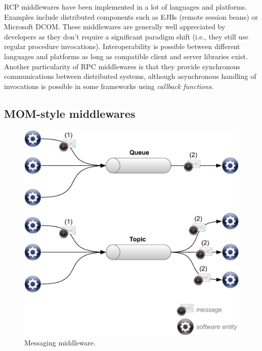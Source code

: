 RCP middlewares have been implemented in a lot of languages and platforms. Examples include distributed components such as EJBs (remote session beans) or Microsoft DCOM. These middlewares are generally well appreciated by developers as they don't require a significant paradigm shift (i.e., they still use regular procedure invocations). Interoperability is possible between different languages and platforms as long as compatible client and server libraries exist. Another particularity of RPC middlewares is that they provide synchronous communications between distributed systems, although asynchronous handling of invocations is possible in some frameworks using \emph{callback functions}.\\


\subsection{MOM-style middlewares}


\begin{figure}[htbp]
    \centering
    \includegraphics[width=\textwidth]{content/web-services/messaging-middleware}
    \caption{Messaging middleware.}
    \label{fig:messaging-middleware}
\end{figure}

